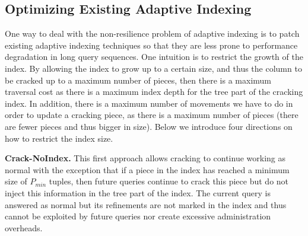 \documentclass{sig-alternate}
\begin{document}
\begin{figure}[t]
{\label{F:lazycrake}
}
\hfill
\hspace{-6.5em}%
\end{figure}

\subsection{Optimizing Existing Adaptive Indexing}
\label{sec:simple}

One way to deal with the non-resilience  problem of adaptive indexing is to patch existing
adaptive indexing techniques so that they are less prone to performance degradation in long
query sequences. One intuition is to restrict the growth of the index.
By allowing the index to grow up to a certain size, and thus the column to be cracked up to a maximum number of pieces,
then there is a maximum traversal cost
as there is a maximum index depth for the tree part of the cracking index.
In addition, there is a maximum number of movements we have to do in order to
update a cracking piece, as there is a maximum number of pieces (there are fewer pieces and thus bigger in size).
Below we introduce four directions on how to restrict the index size.

\textbf{Crack-NoIndex.} This first approach allows cracking to continue working as normal with the exception
that if a piece in the index  has reached a minimum size of $P_{min}$ tuples, then future queries continue to crack this
piece but do not inject this information in the tree part of the index.
The current query is answered as normal  but its refinements are not marked in the index and thus
cannot be exploited by future queries nor create excessive administration overheads.
\end{document}
